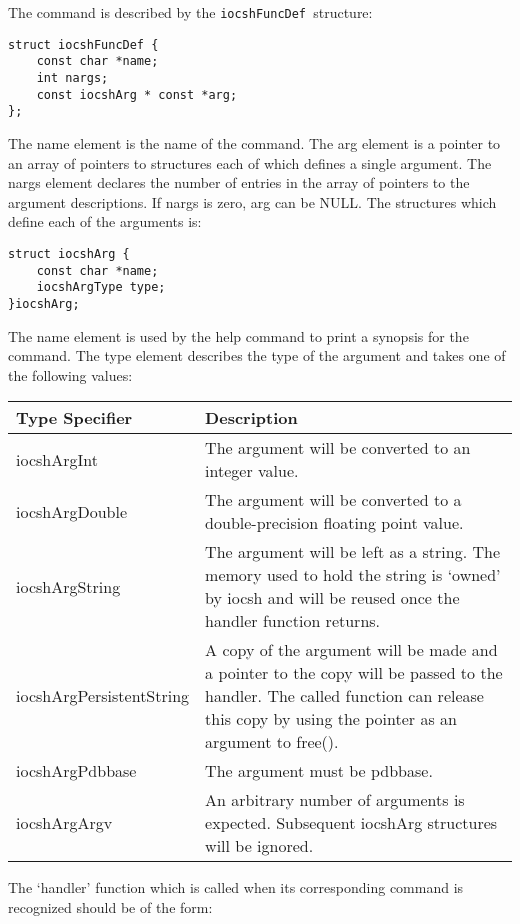 The command is described by the  \verb|iocshFuncDef |structure:

\begin{verbatim}struct iocshFuncDef {
    const char *name;
    int nargs;
    const iocshArg * const *arg;
};
\end{verbatim}The name element is the name of the command.  The arg element is a pointer to an array of pointers to structures each of 
which defines a single argument.  The nargs element declares the number of entries in the array of pointers to the 
argument descriptions.  If nargs is zero, arg can be NULL.  The structures which define each of the arguments is:

\begin{verbatim}struct iocshArg {
    const char *name;
    iocshArgType type;
}iocshArg;
\end{verbatim}The name element is used by the help command to print a synopsis for the command.  The type element describes the type 
of the argument and takes one of the following values:
\begin{center}\begin{longtable}{p{1.5in}p{3.76in}}
Type Specifier & Description\\
\hline
iocshArgInt & The argument will be converted to an integer value.\\
iocshArgDouble & The argument will be converted to a double-precision floating point value.\\
iocshArgString & The argument will be left as a string.  The memory used to hold the string is `owned' by iocsh and will be reused once the handler function returns.\\
iocshArgPersistentString & A copy of the argument will be made and a pointer to the copy will be passed to the handler.  The called function can release this copy by using the pointer as an argument to free().\\
iocshArgPdbbase & The argument must be pdbbase.\\
iocshArgArgv & An arbitrary number of arguments is expected.  Subsequent iocshArg structures will be ignored.
\end{longtable}\end{center}


The `handler' function which is called when its corresponding command is recognized should be of the form:

